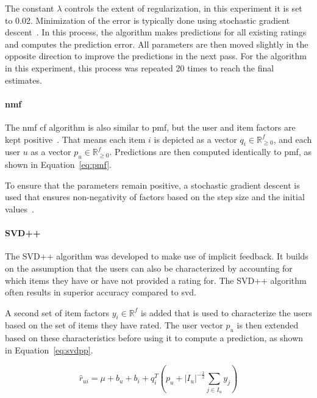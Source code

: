 The constant $\lambda$ controls the extent of regularization, in this experiment it is set to 0.02. Minimization of the error is typically done using stochastic gradient descent~\cite{Hug2020, Ricci2010}.
In this process, the algorithm makes predictions for all existing ratings and computes the prediction error.
All parameters are then moved slightly in the opposite direction to improve the predictions in the next pass.
For the algorithm in this experiment, this process was repeated 20 times to reach the final estimates.

\paragraph{\gls{nmf}}
The \gls{nmf} \gls{cf} algorithm is also similar to \gls{pmf}, but the user and item factors are kept positive~\cite{NMF:2014, NMF_algo, zhang2006learning, Hug2020}.
That means each item $i$ is depicted as a vector $q_i \in \mathbb{R}_{\geq 0}^f$, and each user $u$ as a vector $p_u \in \mathbb{R}_{\geq 0}^f$.
Predictions are then computed identically to \gls{pmf}, as shown in Equation~\ref{eq:pmf}.

To ensure that the parameters remain positive, a stochastic gradient descent is used that ensures non-negativity of factors based on the step size and the initial values~\cite{Hug2020}.

\paragraph{SVD++}
The SVD++ algorithm was developed to make use of implicit feedback.
It builds on the assumption that the users can also be characterized by accounting for which items they have or have not provided a rating for.
The SVD++ algorithm often results in superior accuracy compared to \gls{svd}.

A second set of item factors $y_i \in \mathbb{R}^f$ is added that is used to characterize the users based on the set of items they have rated.
The user vector $p_u$ is then extended based on these characteristics before using it to compute a prediction, as shown in Equation~\ref{eq:svdpp}. 

\begin{equation}
  \label{eq:svdpp}
    \hat{r}_{ui} = \mu + b_u + b_i + q_i^T\left(p_u +
        |I_u|^{-\frac{1}{2}} \sum_{j \in I_u}y_j\right)
\end{equation}

